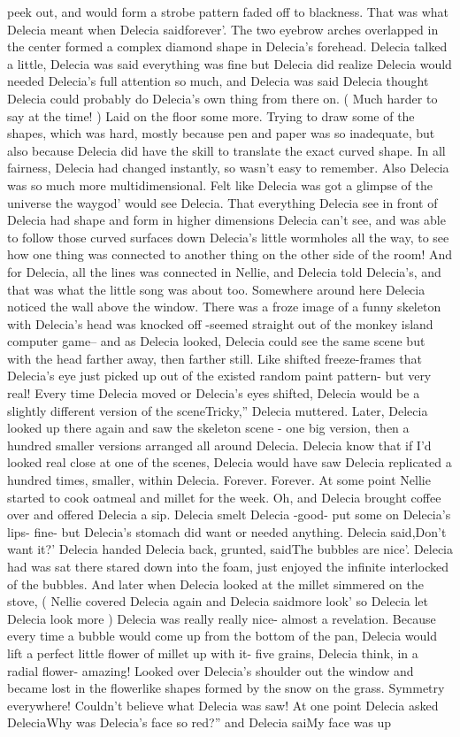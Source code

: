 \documentclass[12pt]{book}
\begin{document}
peek out, and would form a strobe pattern faded off to blackness. That was what Delecia meant when Delecia saidforever'. The two eyebrow arches overlapped in the center formed a complex diamond shape in Delecia's forehead. Delecia talked a little, Delecia was said everything was fine but Delecia did realize Delecia would needed Delecia's full attention so much, and Delecia was said Delecia thought Delecia could probably do Delecia's own thing from there on. ( Much harder to say at the time! ) Laid on the floor some more. Trying to draw some of the shapes, which was hard, mostly because pen and paper was so inadequate, but also because Delecia did have the skill to translate the exact curved shape. In all fairness, Delecia had changed instantly, so wasn't easy to remember. Also Delecia was so much more multidimensional. Felt like Delecia was got a glimpse of the universe the waygod' would see Delecia. That everything Delecia see in front of Delecia had shape and form in higher dimensions Delecia can't see, and was able to follow those curved surfaces down Delecia's little wormholes all the way, to see how one thing was connected to another thing on the other side of the room! And for Delecia, all the lines was connected in Nellie, and Delecia told Delecia's, and that was what the little song was about too. Somewhere around here Delecia noticed the wall above the window. There was a froze image of a funny skeleton with Delecia's head was knocked off -seemed straight out of the monkey island computer game-- and as Delecia looked, Delecia could see the same scene but with the head farther away, then farther still. Like shifted freeze-frames that Delecia's eye just picked up out of the existed random paint pattern- but very real! Every time Delecia moved or Delecia's eyes shifted, Delecia would be a slightly different version of the sceneTricky,'' Delecia muttered. Later, Delecia looked up there again and saw the skeleton scene - one big version, then a hundred smaller versions arranged all around Delecia. Delecia know that if I'd looked real close at one of the scenes, Delecia would have saw Delecia replicated a hundred times, smaller, within Delecia. Forever. Forever. At some point Nellie started to cook oatmeal and millet for the week. Oh, and Delecia brought coffee over and offered Delecia a sip. Delecia smelt Delecia -good- put some on Delecia's lips- fine- but Delecia's stomach did want or needed anything. Delecia said,Don't want it?' Delecia handed Delecia back, grunted, saidThe bubbles are nice'. Delecia had was sat there stared down into the foam, just enjoyed the infinite interlocked of the bubbles. And later when Delecia looked at the millet simmered on the stove, ( Nellie covered Delecia again and Delecia saidmore look' so Delecia let Delecia look more ) Delecia was really really nice- almost a revelation. Because every time a bubble would come up from the bottom of the pan, Delecia would lift a perfect little flower of millet up with it- five grains, Delecia think, in a radial flower- amazing! Looked over Delecia's shoulder out the window and became lost in the flowerlike shapes formed by the snow on the grass. Symmetry everywhere! Couldn't believe what Delecia was saw! At one point Delecia asked DeleciaWhy was Delecia's face so red?'' and Delecia saiMy face was up 
\end{document}
